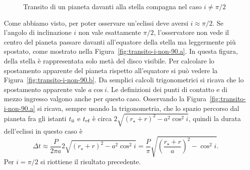 \begin{figure}
{}
  \caption{Transito di un pianeta davanti alla stella compagna nel caso
    $i \neq \pi/2$}
  \label{fig:transito-i-non-90}
\end{figure}
Come abbiamo visto, per poter osservare un'eclissi deve aversi $i \approx
\pi/2$. Se l'angolo di inclinazione $i$ non vale esattamente $\pi/2$,
l'osservatore non vede il centro del pianeta passare davanti all'equatore della
stella ma leggermente più spostato, come mostrato nella
Figura~\ref{fig:transito-i-non-90.a}. In questa figura, della stella è
rappresentata solo metà del disco visibile. Per calcolare lo spostamento
apparente del pianeta rispetto all'equatore si può vedere la
Figura~\ref{fig:transito-i-non-90.b}. Da semplici calcoli trigonometrici si
ricava che lo spostamento apparente vale $a \cos i$. Le definizioni dei punti di
contatto e di mezzo ingresso valgono anche per questo caso. Osservando la
Figura~\ref{fig:transito-i-non-90.a} si ricava, sempre usando la trigonometria,
che lo spazio percorso dal pianeta fra gli istanti $t_{\textup{ii}}$ e
$t_{\textup{ef}}$ è circa $2\sqrt{(r_\star + r)^2 - a^2\cos^2 i}$, quindi la
durata dell'eclissi in questo caso è
\begin{equation}
  \Delta t \approx \frac{P}{2\pi a} 2\sqrt{(r_\star + r)^2 - a^2\cos^2 i} =
  \frac{P}{\pi} \sqrt{\left(\frac{r_\star + r}{a}\right)^2 - \cos^2 i}.
\end{equation}
Per $i = \pi/2$ si riottiene il risultato precedente.

